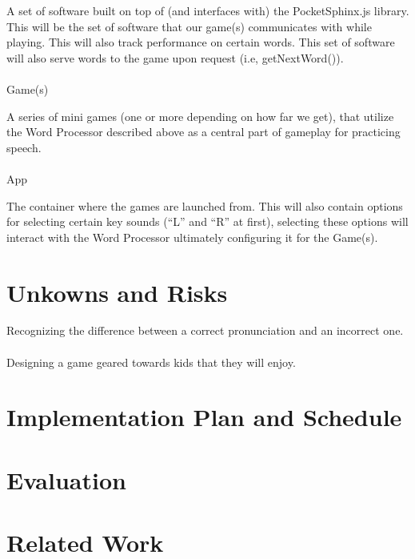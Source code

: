 \documentclass{article}
\begin{document}
A set of software built on top of (and interfaces with) the PocketSphinx.js library. This will be the set of software that our game(s) communicates with while playing. This will also track performance on certain words. This set of software will also serve words to the game upon request (i.e, getNextWord()).\\\\
Game(s)

A series of mini games (one or more depending on how far we get), that utilize the Word Processor described above as a central part of gameplay for practicing speech.\\\\
App

The container where the games are launched from. This will also contain options for selecting certain key sounds (``L'' and ``R'' at first), selecting these options will interact with the Word Processor ultimately configuring it for the Game(s).

\section{Unkowns and Risks}

Recognizing the difference between a correct pronunciation and an incorrect one.\\\\
Designing a game geared towards kids that they will enjoy.

\section{Implementation Plan and Schedule}

\section{Evaluation}

\section{Related Work}
\end{document}
